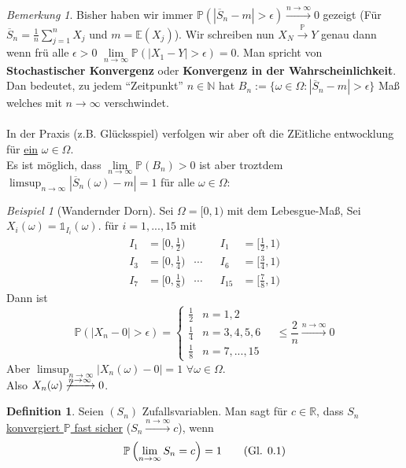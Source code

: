 \documentclass[10pt,a4paper]{article}
\newcommand{\N}{\ensuremath{\mathbb{N}}}
\newcommand{\R}{\ensuremath{\mathbb{R}}}
\newcommand{\ol}[1]{\overline{#1}}
\newcommand{\abs}[1]{\left|#1\right|}
\newcommand{\cha}{\mathds{1}}
\newcommand{\Prb}{\mathbb P}
\newcommand{\Epv}{\ensuremath{\mathbb{E}}}
\theoremstyle{plain}
\theoremstyle{definition}
\newtheorem{definition}[theorem]{Definition}
\theoremstyle{remark}
\newtheorem*{bem*}{Bemerkung}
\newtheorem{exm}[theorem]{Beispiel}
\newcommand{\autotag}{\stepcounter{equation}\tag{Gl. \arabic{section}.\arabic{equation}}}
\begin{document}
	\begin{bem*}
		Bisher haben wir immer $\Prb(\abs{\ol S_n-m}>\epsilon)\xrightarrow{n\to\infty}0$ gezeigt (Für $\ol S_n=\frac{1}{n}\sum_{j=1}^{n}X_j$ und $m=\Epv(X_j)$). Wir schreiben nun $X_N\xrightarrow{\Prb}Y$ genau dann wenn frü alle $\epsilon>0$ $\lim\limits_{n\to\infty}\Prb(\abs{X_1-Y}>\epsilon)=0$. Man spricht von \textbf{Stochastischer Konvergenz} oder \textbf{Konvergenz in der Wahrscheinlichkeit}.\\
		Dan bedeutet, zu jedem \enquote{Zeitpunkt} $n\in\N$ hat $B_n:=\{\omega\in\Omega:\abs{\ol S_n-m}>\epsilon\}$ Maß welches mit $n\to\infty$ verschwindet.\\
		\\
		In der Praxis (z.B. Glücksspiel) verfolgen wir aber oft die ZEitliche entwocklung für \underline{ein} $\omega\in\Omega$.\\
		Es ist möglich, dass $\lim\limits_{n\to\infty}\Prb(B_n)>0$ ist aber troztdem $\limsup_{n\to\infty}\abs{\ol S_n(\omega)-m}=1$ für alle $\omega\in\Omega$:
		
	\end{bem*}

	\begin{exm}[Wandernder Dorn]
		Sei $\Omega=[0,1)$ mit dem Lebesgue-Maß, Sei $X_i(\omega)=\cha_{I_i}(\omega)$. für $i=1,...,15$ mit
		\begin{align*}
		I_1&=\big[0,\frac{1}{2}\big)&&&I_1&=\big[\frac{1}{2},1\big)\\
		I_3&=\big[0,\frac{1}{4}\big)&\cdots&&I_6&=\big[\frac{3}{4},1\big)\\
		I_7&=\big[0,\frac{1}{8}\big)&\cdots&&I_{15}&=\big[\frac{7}{8},1\big)
		\end{align*}
		Dann ist 
		\[\Prb(|X_n-0|>\epsilon)=\begin{cases}
		\frac{1}{2}&n=1,2\\
		\frac{1}{4}&n=3,4,5,6\\
		\frac{1}{8}&n=7,...,15
		\end{cases}\quad\leq\frac{2}{n}\xrightarrow{n\to\infty}0\]
		Aber $\limsup_{n\to\infty}|X_n(\omega)-0|=1$ $\forall\omega\in\Omega$.\\
		Also $X_n(\omega)\not\xrightarrow{n\to\infty}0$.
	\end{exm}

	\begin{definition}\label{0507def}
		Seien $(S_n)$ Zufallsvariablen. Man sagt für $c\in\R$, dass $S_n$ \underline{konvergiert $\Prb$ fast sicher} ($S_n\xrightarrow{n\to\infty}c$), wenn \[\Prb\left(\lim\limits_{n\to\infty} S_n=c\right)=1\autotag\label{eq:0502}\]
	\end{definition}
	
\end{document}
